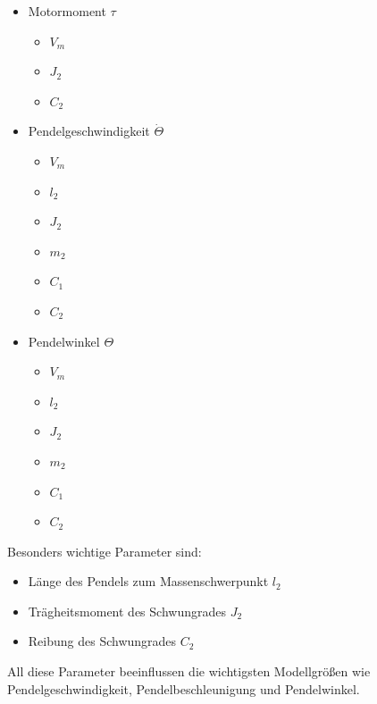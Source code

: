 \begin{minipage}[t]{.5\textwidth}
    \begin{itemize}
    \item Motormoment $\tau$
    \begin{itemize}
        \item $V_m$
        \item $J_2$
        \item $C_2$
    \end{itemize}
    \item Pendelgeschwindigkeit $\dot\Theta$
    \begin{itemize}
        \item $V_m$
        \item $l_2$
        \item $J_2$
        \item $m_2$
        \item $C_1$
        \item $C_2$
    \end{itemize}
    \item Pendelwinkel $\Theta$
    \begin{itemize}
        \item $V_m$
        \item $l_2$
        \item $J_2$
        \item $m_2$
        \item $C_1$
        \item $C_2$ 
    \end{itemize}
\end{itemize}
\end{minipage}

Besonders wichtige Parameter sind:
\begin{itemize}
    \item Länge des Pendels zum Massenschwerpunkt $l_2$
    \item Trägheitsmoment des Schwungrades $J_2$
    \item Reibung des Schwungrades $C_2$
\end{itemize}
All diese Parameter beeinflussen die wichtigsten Modellgrößen wie Pendelgeschwindigkeit, Pendelbeschleunigung und Pendelwinkel.\\


